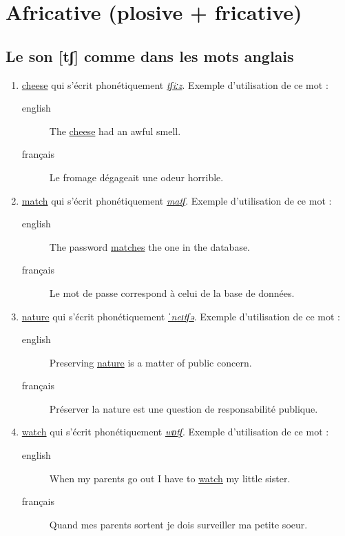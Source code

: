 \documentclass[12pt,a4paper]{book}
\begin{document}
\section{Africative (plosive + fricative)}
\label{sec:org54afee9}
\subsection{Le son [tʃ] comme dans les mots anglais}
\label{sec:orgd294ba3}
\begin{enumerate}
\item \href{http://www.wordreference.com/enfr/cheese}{cheese} qui s'écrit phonétiquement \href{https://en.oxforddictionaries.com/definition/cheese}{\emph{tʃiːz}}. Exemple d'utilisation de
ce mot :
\begin{description}
\item[{english}] \textenglish{The \href{https://youtu.be/xYyP9o8wXtc}{cheese} had an awful smell.}
\item[{français}] Le fromage dégageait une odeur horrible.
\end{description}
\item \href{http://www.wordreference.com/enfr/match}{match} qui s'écrit phonétiquement \href{https://en.oxforddictionaries.com/definition/match}{\emph{matʃ}}. Exemple d'utilisation de
ce mot :
\begin{description}
\item[{english}] \textenglish{The password \href{https://youtu.be/-o\_IoZdtbWs}{matches} the one in the database.}
\item[{français}] Le mot de passe correspond à celui de la base de
données.
\end{description}
\item \href{http://www.wordreference.com/enfr/nature}{nature} qui s'écrit phonétiquement \href{https://en.oxforddictionaries.com/definition/nature}{\emph{ˈneɪtʃə}}. Exemple d'utilisation
de ce mot :
\begin{description}
\item[{english}] \textenglish{Preserving \href{https://youtu.be/K\_jwPJM0QSc}{nature} is a matter of public concern.}
\item[{français}] Préserver la nature est une question de
responsabilité publique.
\end{description}
\item \href{http://www.wordreference.com/enfr/watch}{watch} qui s'écrit phonétiquement \href{https://en.oxforddictionaries.com/definition/watch}{\emph{wɒtʃ}}. Exemple d'utilisation de
ce mot :
\begin{description}
\item[{english}] \textenglish{When my parents go out I have to \href{https://youtu.be/Eya0daHX-Fw}{watch} my little
sister.}
\item[{français}] Quand mes parents sortent je dois surveiller ma
petite soeur.
\end{description}
\end{enumerate}
\end{document}
